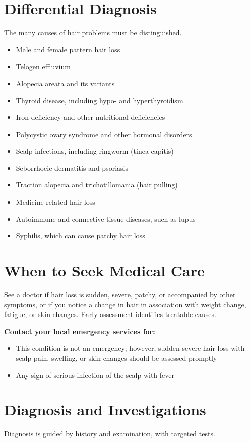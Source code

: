 \section*{Differential Diagnosis}
The many causes of hair problems must be distinguished.

\begin{itemize}
    \item Male and female pattern hair loss
    \item Telogen effluvium
    \item Alopecia areata and its variants
    \item Thyroid disease, including hypo- and hyperthyroidism
    \item Iron deficiency and other nutritional deficiencies
    \item Polycystic ovary syndrome and other hormonal disorders
    \item Scalp infections, including ringworm (tinea capitis)
    \item Seborrhoeic dermatitis and psoriasis
    \item Traction alopecia and trichotillomania (hair pulling)
    \item Medicine-related hair loss
    \item Autoimmune and connective tissue diseases, such as lupus
    \item Syphilis, which can cause patchy hair loss
\end{itemize}

\section*{When to Seek Medical Care}
See a doctor if hair loss is sudden, severe, patchy, or accompanied by other symptoms, or if you notice a change in hair in association with weight change, fatigue, or skin changes. Early assessment identifies treatable causes.

\textbf{Contact your local emergency services for:}
\begin{itemize}
    \item This condition is not an emergency; however, sudden severe hair loss with scalp pain, swelling, or skin changes should be assessed promptly
    \item Any sign of serious infection of the scalp with fever
\end{itemize}

\section*{Diagnosis and Investigations}
Diagnosis is guided by history and examination, with targeted tests.

